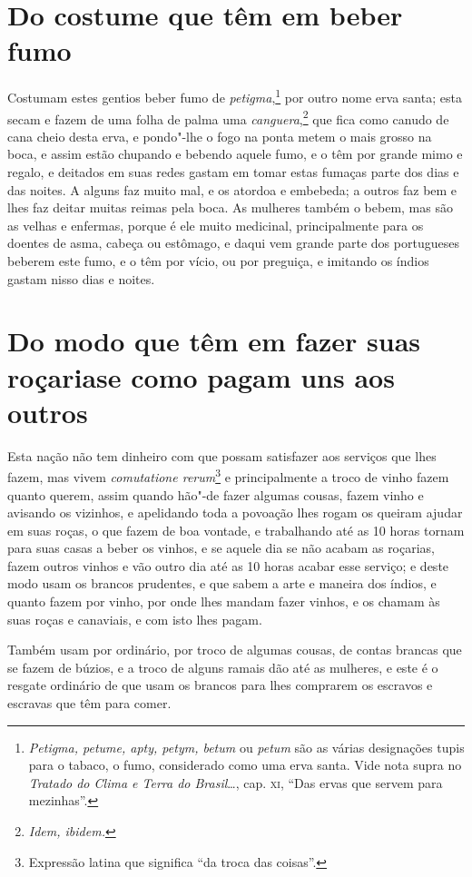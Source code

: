 \section{Do costume que têm em beber fumo} 
Costumam estes gentios beber fumo de \textit{petigma},\footnote{ \textit{Petigma, 
petume, apty, petym, betum} ou \textit{petum} são as várias designações tupis para o tabaco, o fumo,
considerado como uma erva santa. Vide nota supra no \textit{Tratado do
Clima e Terra do Brasil}\ldots{}, cap. \textsc{xi}, ``Das ervas que servem
para mezinhas''.} por outro nome erva santa; esta
secam e fazem de uma folha de palma uma \textit{canguera},\footnote{ \textit{Idem, ibidem.}} 
que fica como canudo de cana cheio desta erva, e pondo"-lhe o fogo na ponta metem o mais grosso na boca, e
assim estão chupando e bebendo aquele fumo, e o têm por grande mimo e
regalo, e deitados em suas redes gastam em tomar estas fumaças parte
dos dias e das noites. A alguns faz muito mal, e os atordoa e embebeda;
a outros faz bem e lhes faz deitar muitas reimas pela boca. As mulheres
também o bebem, mas são as velhas e enfermas, porque é ele muito
medicinal, principalmente para os doentes de asma, cabeça ou estômago,
e daqui vem grande parte dos portugueses beberem este fumo, e o têm por
vício, ou por preguiça, e imitando os índios gastam nisso dias e noites.

\section[Do modo que têm em fazer suas roçarias]{Do modo que têm em fazer suas roçarias\break e como pagam uns aos outros} 
Esta nação não tem dinheiro com que possam satisfazer aos
serviços que lhes fazem, mas vivem \textit{comutatione rerum}\footnote{ Expressão latina que significa ``da troca das coisas''.} e
principalmente a troco de vinho fazem quanto querem, assim quando
hão"-de fazer algumas cousas, fazem vinho e avisando os vizinhos, e
apelidando toda a povoação lhes rogam os queiram ajudar em suas roças,
o que fazem de boa vontade, e trabalhando até as 10 horas tornam para
suas casas a beber os vinhos, e se aquele dia se não acabam as
roçarias, fazem outros vinhos e vão outro dia até as 10 horas acabar
esse serviço; e deste modo usam os brancos prudentes, e que sabem a
arte e maneira dos índios, e quanto fazem por vinho, por onde lhes
mandam fazer vinhos, e os chamam às suas roças e canaviais, e com isto lhes pagam.

 Também usam por ordinário, por troco de algumas cousas, de contas
brancas que se fazem de búzios, e a troco de alguns ramais dão até as
mulheres, e este é o resgate ordinário de que usam os brancos para lhes
comprarem os escravos e escravas que têm para comer.

